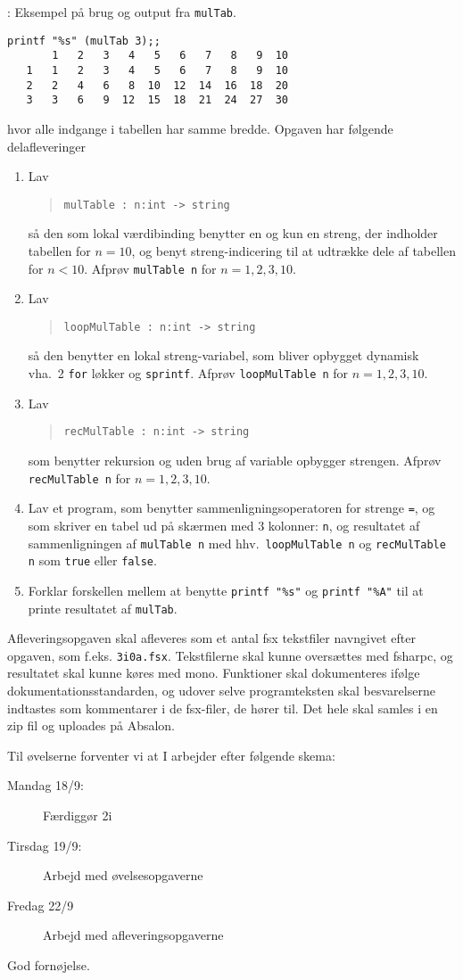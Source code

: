 \documentclass[a4paper,12pt]{article}
\begin{document}
\begin{enumerate}[label=3i.\arabic*,start=0]
\begin{codeNOutput}[label=mulTab]{: Eksempel på brug og output fra \lstinline!mulTab!.}
\begin{lstlisting}
printf "%s" (mulTab 3);;
       1   2   3   4   5   6   7   8   9  10
   1   1   2   3   4   5   6   7   8   9  10
   2   2   4   6   8  10  12  14  16  18  20
   3   3   6   9  12  15  18  21  24  27  30
\end{lstlisting}
\end{codeNOutput}
hvor alle indgange i tabellen har samme bredde. Opgaven har følgende delafleveringer
  \begin{enumerate}
  \item Lav
    \begin{quote}
      \mbox{\lstinline!mulTable : n:int -> string!}
    \end{quote}
så den som lokal værdibinding benytter en og kun en streng, der indholder tabellen for $n=10$, og benyt streng-indicering til at udtrække dele af tabellen for $n<10$.  Afprøv \mbox{\lstinline!mulTable n!} for $n= 1, 2, 3, 10$.
  \item Lav
    \begin{quote}
      \mbox{\lstinline!loopMulTable : n:int -> string!}
    \end{quote}
så den benytter en lokal streng-variabel, som bliver opbygget dynamisk vha.\ 2 \lstinline!for! løkker og \lstinline!sprintf!.  Afprøv \mbox{\lstinline!loopMulTable n!} for $n= 1, 2, 3, 10$.
  \item Lav
    \begin{quote}
      \mbox{\lstinline!recMulTable : n:int -> string!}
    \end{quote}
som benytter rekursion og uden brug af variable opbygger strengen. Afprøv \mbox{\lstinline!recMulTable n!} for $n= 1, 2, 3, 10$.
  \item Lav et program, som benytter sammenligningsoperatoren for strenge \lstinline!=!, og som skriver en tabel ud på skærmen med 3 kolonner: \lstinline!n!, og resultatet af sammenligningen af \mbox{\lstinline!mulTable n!} med hhv.\ \mbox{\lstinline!loopMulTable n!} og \mbox{\lstinline!recMulTable n!} som \lstinline!true! eller \lstinline!false!.
  \item Forklar forskellen mellem at benytte \lstinline!printf "%s"! og \lstinline!printf "%A"! til at printe resultatet af \lstinline!mulTab!.
  \end{enumerate}
\end{enumerate}
Afleveringsopgaven skal afleveres som et antal fsx tekstfiler navngivet efter opgaven, som f.eks. \lstinline!3i0a.fsx!. Tekstfilerne skal kunne oversættes med fsharpc, og resultatet skal kunne køres med mono. Funktioner skal dokumenteres ifølge dokumentationsstandarden, og udover selve programteksten skal besvarelserne indtastes som kommentarer i de fsx-filer, de hører til. Det hele skal samles i en zip fil og uploades på Absalon.

Til øvelserne forventer vi at I arbejder efter følgende skema:
\begin{description}
\item[Mandag 18/9:] Færdiggør 2i
\item[Tirsdag 19/9:] Arbejd med øvelsesopgaverne
\item[Fredag 22/9]  Arbejd med afleveringsopgaverne
\end{description}

\flushright God fornøjelse.
\end{document}
